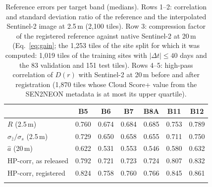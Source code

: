 \documentclass[pdflatex,sn-basic,referee,lineno]{sn-jnl}
\begin{document}
\begin{table}[t]
\caption{Reference errors per target band (medians). Rows 1--2: correlation and standard deviation ratio of the
reference and the interpolated Sentinel-2 image at 2.5\,m (2,100 tiles). Row 3: compression factor of the registered
reference against native Sentinel-2 at 20\,m (Eq.~\ref{eq:gain}; the 1,253 tiles of the site split for which it was
computed: 1,019 tiles of the training sites with $|\Delta t|\le40$ days and the 83 validation and 151 test
tiles). Rows 4--5:
high-pass correlation of $D(r)$ with Sentinel-2 at 20\,m before and after registration (1,870 tiles whose Cloud
Score+ value from the SEN2NEON metadata is at most its upper quartile).}\label{tab:errors}
\begin{tabular*}{\textwidth}{@{\extracolsep\fill}lcccccc}
\toprule
 & B5 & B6 & B7 & B8A & B11 & B12 \\
\midrule
$R$ (2.5\,m) & 0.760 & 0.674 & 0.684 & 0.685 & 0.753 & 0.789 \\
$\sigma_{\hat z}/\sigma_s$ (2.5\,m) & 0.729 & 0.650 & 0.658 & 0.655 & 0.711 & 0.750 \\
$\hat a$ (20\,m) & 0.622 & 0.531 & 0.553 & 0.546 & 0.580 & 0.632 \\
HP-corr, as released & 0.792 & 0.721 & 0.723 & 0.724 & 0.807 & 0.832 \\
HP-corr, registered & 0.824 & 0.758 & 0.760 & 0.766 & 0.845 & 0.861 \\
\botrule
\end{tabular*}
\end{table}
\end{document}
